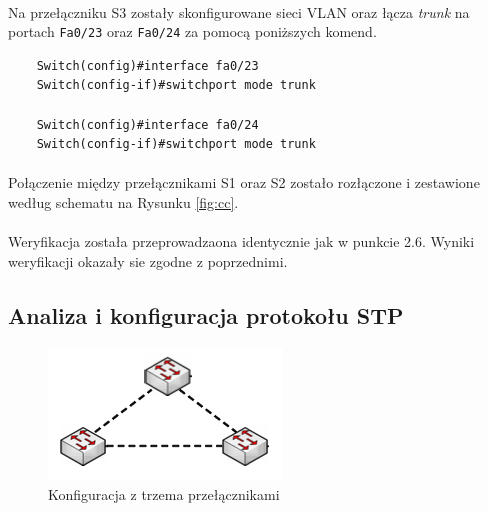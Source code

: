 \documentclass[wide,a4paper,titlepage,12pt] {article}
\begin{document}
  \paragraph{}
  Na przełączniku S3 zostały skonfigurowane sieci VLAN oraz łącza \emph{trunk} na portach \texttt{Fa0/23} oraz \texttt{Fa0/24} za pomocą poniższych komend.

  \begin{verbatim}
    Switch(config)#interface fa0/23
    Switch(config-if)#switchport mode trunk

    Switch(config)#interface fa0/24
    Switch(config-if)#switchport mode trunk
  \end{verbatim}

  \paragraph{}
  Połączenie między przełącznikami S1 oraz S2 zostało rozłączone i zestawione według schematu na Rysunku \ref{fig:cc}.

  \paragraph{}
  Weryfikacja została przeprowadzaona identycznie jak w punkcie 2.6. Wyniki weryfikacji okazały sie zgodne z poprzednimi.



  \subsection{Analiza i konfiguracja protokołu STP}
  \begin{figure}[H]
    \begin{center}
      \includegraphics[width=\textwidth]{img/dd.PNG}
      \caption{Konfiguracja z trzema przełącznikami}
      \label{fig:dd}
    \end{center}
  \end{figure}
\end{document}
